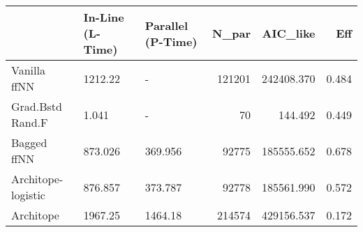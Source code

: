 \begin{tabular}{lllrrr}
\toprule
{} & In-Line (L-Time) & Parallel (P-Time) &   N\_par &    AIC\_like &    Eff \\
\midrule
Vanilla ffNN       &          1212.22 &                 - &  121201 &  242408.370 &  0.484 \\
Grad.Bstd Rand.F   &            1.041 &                 - &      70 &     144.492 &  0.449 \\
Bagged ffNN        &          873.026 &           369.956 &   92775 &  185555.652 &  0.678 \\
Architope-logistic &          876.857 &           373.787 &   92778 &  185561.990 &  0.572 \\
Architope          &          1967.25 &           1464.18 &  214574 &  429156.537 &  0.172 \\
\bottomrule
\end{tabular}
